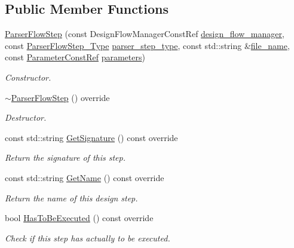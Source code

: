 \subsection*{Public Member Functions}
\begin{DoxyCompactItemize}
\item 
\hyperlink{classParserFlowStep_a9b43a17358242fb4dfb54eb3d4091d96}{Parser\+Flow\+Step} (const Design\+Flow\+Manager\+Const\+Ref \hyperlink{classDesignFlowStep_ab770677ddf087613add30024e16a5554}{design\+\_\+flow\+\_\+manager}, const \hyperlink{parser__flow__step_8hpp_a8e093a5d7a60426e90f01aa6e6a1aa6a}{Parser\+Flow\+Step\+\_\+\+Type} \hyperlink{classParserFlowStep_a69d47e5729f1d625614006fddaefc345}{parser\+\_\+step\+\_\+type}, const std\+::string \&\hyperlink{classParserFlowStep_a728b0a03e63e3529176b848880d12c72}{file\+\_\+name}, const \hyperlink{Parameter_8hpp_a37841774a6fcb479b597fdf8955eb4ea}{Parameter\+Const\+Ref} \hyperlink{classDesignFlowStep_a802eaafe8013df706370679d1a436949}{parameters})
\begin{DoxyCompactList}\small\item\em Constructor. \end{DoxyCompactList}\item 
\hyperlink{classParserFlowStep_abe1ae8ae35d1337ab7d8ed62cc5a47bf}{$\sim$\+Parser\+Flow\+Step} () override
\begin{DoxyCompactList}\small\item\em Destructor. \end{DoxyCompactList}\item 
const std\+::string \hyperlink{classParserFlowStep_aa20842b21ed80673edb2fc8a664cc9b6}{Get\+Signature} () const override
\begin{DoxyCompactList}\small\item\em Return the signature of this step. \end{DoxyCompactList}\item 
const std\+::string \hyperlink{classParserFlowStep_adc59d75712212fd7d908550665d5719b}{Get\+Name} () const override
\begin{DoxyCompactList}\small\item\em Return the name of this design step. \end{DoxyCompactList}\item 
bool \hyperlink{classParserFlowStep_afaf2f3989d660b1cfaa00c8d51deb570}{Has\+To\+Be\+Executed} () const override
\begin{DoxyCompactList}\small\item\em Check if this step has actually to be executed. \end{DoxyCompactList}\item 

\end{DoxyCompactItemize}
